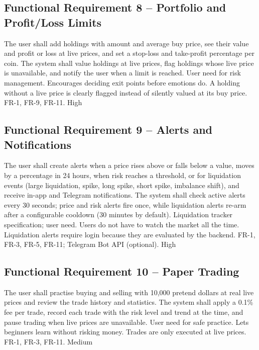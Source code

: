 \subsection{Functional Requirement 8 -- Portfolio and Profit/Loss Limits}
{The user shall add holdings with amount and average buy price, see their value and profit or loss at live prices, and set a stop-loss and take-profit percentage per coin.}
{The system shall value holdings at live prices, flag holdings whose live price is unavailable, and notify the user when a limit is reached.}
{User need for risk management.}
{Encourages deciding exit points before emotions do.}
{A holding without a live price is clearly flagged instead of silently valued at its buy price.}
{FR-1, FR-9, FR-11.}
{High}

\subsection{Functional Requirement 9 -- Alerts and Notifications}
{The user shall create alerts when a price rises above or falls below a value, moves by a percentage in 24 hours, when risk reaches a threshold, or for liquidation events (large liquidation, spike, long spike, short spike, imbalance shift), and receive in-app and Telegram notifications.}
{The system shall check active alerts every 30 seconds; price and risk alerts fire once, while liquidation alerts re-arm after a configurable cooldown (30 minutes by default).}
{Liquidation tracker specification; user need.}
{Users do not have to watch the market all the time.}
{Liquidation alerts require login because they are evaluated by the backend.}
{FR-1, FR-3, FR-5, FR-11; Telegram Bot API (optional).}
{High}

\subsection{Functional Requirement 10 -- Paper Trading}
{The user shall practise buying and selling with 10{,}000 pretend dollars at real live prices and review the trade history and statistics.}
{The system shall apply a 0.1\% fee per trade, record each trade with the risk level and trend at the time, and pause trading when live prices are unavailable.}
{User need for safe practice.}
{Lets beginners learn without risking money.}
{Trades are only executed at live prices.}
{FR-1, FR-3, FR-11.}
{Medium}

